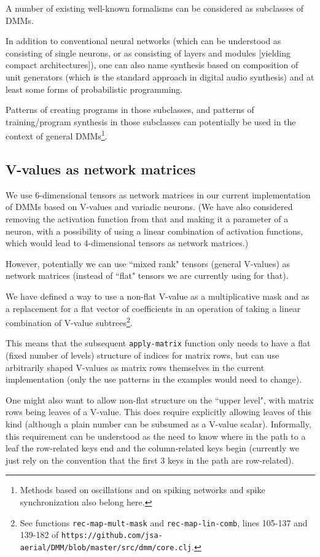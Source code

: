 \documentclass{article}
\begin{document}
A number of existing well-known formalisms can be considered as subclasses of DMMs.

In addition to conventional neural networks (which can be understood as consisting of
single neurons, or as consisting of layers and modules [yielding compact architectures]), 
one can also name synthesis based on composition of
unit generators (which is the standard approach in digital audio synthesis) and at least some forms
of probabilistic programming.

Patterns of creating programs in those subclasses, and patterns of training/program synthesis
in those subclasses can potentially be used in the context of general DMMs\footnote{Methods based
on oscillations and on spiking networks and spike synchronization also belong here.}.

\subsection{V-values as network matrices}\label{sec:vvalue-matrices}

We use 6-dimensional tensors as network matrices in our current implementation of DMMs based on V-values
and variadic neurons. (We have also considered removing the activation function from that and making it a parameter
of a neuron, with a possibility of using a linear combination of activation functions, which would lead to 4-dimensional
tensors as network matrices.)

However, potentially we can use ``mixed rank" tensors (general V-values) as network matrices (instead of ``flat" tensors
we are currently using for that).

We have defined a way to use a non-flat V-value as a multiplicative mask and as a replacement for
a flat vector of coefficients in an operation of taking a linear combination of V-value subtrees\footnote{See functions {\tt rec-map-mult-mask}
and {\tt rec-map-lin-comb}, lines 105-137  and  139-182 of {\tt https://github.com/jsa-aerial/DMM/blob/master/src/dmm/core.clj}.}.

This means that the subsequent {\tt apply-matrix} function only needs to have a flat (fixed number of levels) structure
of indices for matrix rows, but can use arbitrarily shaped V-values as matrix rows themselves in the current implementation
(only the use patterns in the examples would need to change).

One might also want to allow non-flat structure on the ``upper level", with matrix rows being leaves of a V-value.
This does require explicitly allowing leaves of this kind (although a plain number can be subsumed as a V-value scalar).
Informally, this requirement can be understood as the need to know where in the path to a leaf the row-related keys end
and the column-related keys begin (currently we just rely on the convention that the first 3 keys in the path are row-related).
\end{document}
